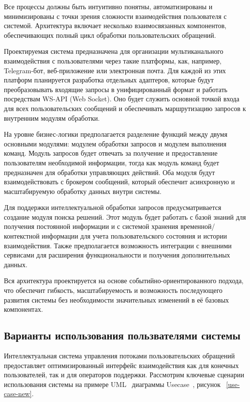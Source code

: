Все процессы должны быть интуитивно понятны, автоматизированы и минимизированы с точки зрения сложности взаимодействия пользователя с системой. Архитектура включает несколько взаимосвязанных компонентов, обеспечивающих полный цикл обработки пользовательских обращений.


Проектируемая система предназначена для организации мультиканального взаимодействия с пользователями через такие платформы, как, например, Telegram-бот, веб-приложение или электронная почта. Для каждой из этих платформ планируется разработка отдельных адаптеров, которые будут преобразовывать входящие запросы в унифицированный формат и работать посредствам WS-API (Web Socket). Оно будет служить основной точкой входа для всех пользовательских сообщений и обеспечивать маршрутизацию запросов к внутренним модулям обработки.

На уровне бизнес-логики предполагается разделение функций между двумя основными модулями: модулем обработки запросов и модулем выполнения команд. Модуль запросов будет отвечать за получение и предоставление пользователям необходимой информации, тогда как модуль команд будет предназначен для обработки управляющих действий. Оба модуля будут взаимодействовать с брокером сообщений, который обеспечит асинхронную и масштабируемую обработку данных внутри системы.

Для поддержки интеллектуальной обработки запросов предусматривается создание модуля поиска решений. Этот модуль будет работать с базой знаний для получения постоянной информации и с системой хранения временной/контекстной информации для учета пользовательского состояния и истории взаимодействия. Также предполагается возможность интеграции с внешними сервисами для расширения функциональности и получения дополнительных данных.

Вся архитектура проектируется на основе событийно-ориентированного подхода, что обеспечит гибкость, масштабируемость и возможность последующего развития системы без необходимости значительных изменений в её базовых компонентах.


\subsection{Варианты использования пользвателями системы}

Интеллектуальная система управления потоками пользовательских обращений предоставляет оптимизированный интерфейс взаимодействия как для конечных пользователей, так и для операторов поддержки. Рассмотрим ключевые сценарии использования системы на примере UML~\cite{Uml} диаграммы Usecase~\cite{Usecase}, рисунок ~\ref{use-case-new}.

